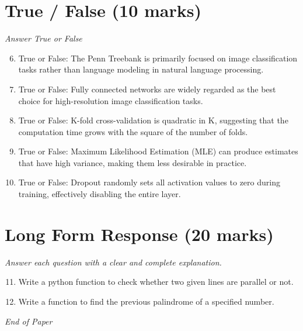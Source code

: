 \documentclass[12pt]{article}
\begin{document}
\section*{True / False (10 marks)}
\textit{Answer True or False}
\begin{enumerate}[label=\arabic*.]
\setcounter{enumi}{5}
\item True or False: The Penn Treebank is primarily focused on image classification tasks rather than language modeling in natural language processing.
\item True or False: Fully connected networks are widely regarded as the best choice for high-resolution image classification tasks.
\item True or False: K-fold cross-validation is quadratic in K, suggesting that the computation time grows with the square of the number of folds.
\item True or False: Maximum Likelihood Estimation (MLE) can produce estimates that have high variance, making them less desirable in practice.
\item True or False: Dropout randomly sets all activation values to zero during training, effectively disabling the entire layer.
\end{enumerate}

\section*{Long Form Response (20 marks)}
\textit{Answer each question with a clear and complete explanation.}
\begin{enumerate}[label=\arabic*.]
\setcounter{enumi}{10}
\item Write a python function to check whether two given lines are parallel or not.
\item Write a function to find the previous palindrome of a specified number.
\end{enumerate}

\vfill
\noindent\textit{End of Paper}
\end{document}
